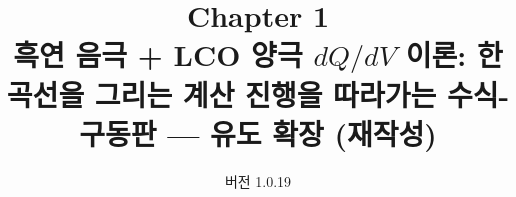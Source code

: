 

\title{\textbf{\LARGE Chapter 1}\\[0.35em]\Large 흑연 음극 + LCO 양극 $dQ/dV$ 이론: 한 곡선을 그리는 계산 진행을 따라가는 수식-구동판 — 유도 확장 (재작성)}
\author{}
\date{\normalsize 버전 1.0.19}


\maketitle

























